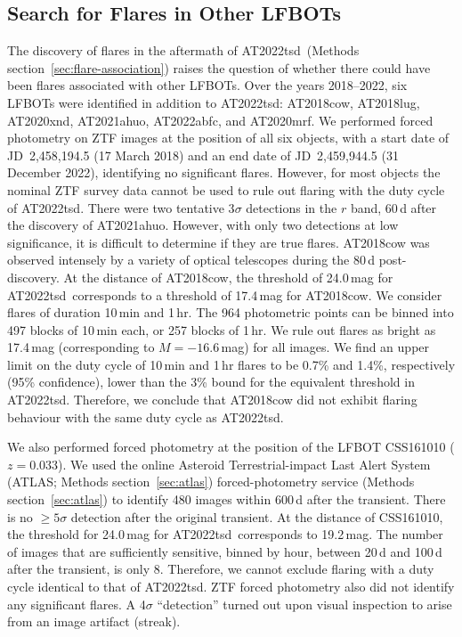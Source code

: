 \documentclass{nature_plusfigure}
\newcommand{\at}{AT2022tsd}
\begin{document}
\begin{methods}
\section{Search for Flares in Other LFBOTs}
\label{sec:flare-search}

The discovery of flares in the aftermath of \at\ (Methods section~\ref{sec:flare-association}) raises the question of whether there could have been flares associated with other LFBOTs. 
Over the years 2018--2022, six LFBOTs were identified in addition to \at: AT2018cow\cite{Prentice2018}, AT2018lug\cite{Ho2020_Koala}, AT2020xnd\cite{Perley2021}, AT2021ahuo, AT2022abfc\cite{Ho2022_AT2022abfc},  
and AT2020mrf\cite{Yao2022}. 
We performed forced photometry on ZTF images at the position of all six objects, with a start date of JD~2,458,194.5 (17 March 2018) and an end date of JD~2,459,944.5 (31 December 2022), identifying no significant flares.
However, for most objects %
the nominal ZTF survey data cannot be used to rule out flaring with the duty cycle of \at.
There were two tentative 3$\sigma$ detections in the $r$ band, 60\,d after the discovery of AT2021ahuo. However, with only two detections at low significance, it is difficult to determine if they are true flares.
AT2018cow was observed intensely by a variety of optical telescopes during the 80\,d post-discovery\cite{Perley2019}. At the distance of AT2018cow, the threshold of 24.0\,mag for \at\ corresponds to a threshold of 17.4\,mag for AT2018cow. We consider flares of duration 10\,min and 1\,hr. The 964 photometric points can be binned into 497 blocks of 10\,min each, or 257 blocks of 1\,hr. We rule out flares as bright as 17.4\,mag (corresponding to $M=-16.6\,$mag) for all images. We find an upper limit on the duty cycle of 10\,min and 1\,hr flares to be 0.7\% and 1.4\%, respectively (95\% confidence), lower than the 3\% bound for the equivalent threshold in \at. Therefore, we conclude that AT2018cow did not exhibit flaring behaviour with the same duty cycle as \at.

We also performed forced photometry at the position of the LFBOT CSS161010\cite{Coppejans2020} ($z=0.033$). 
We used the online Asteroid Terrestrial-impact Last Alert System (ATLAS; Methods section~\ref{sec:atlas})
forced-photometry service (Methods section~\ref{sec:atlas}) to identify 480 images within 600\,d after the transient. There is no $\geq5\sigma$ detection after the original transient. At the distance of CSS161010, the threshold for 24.0\,mag for \at\ corresponds to 19.2\,mag. The number of images that are sufficiently sensitive, binned by hour, between 20\,d and 100\,d after the transient, is only 8. Therefore, we cannot exclude flaring with a duty cycle identical to that of \at.
ZTF forced photometry also did not identify any significant flares. A 4$\sigma$ ``detection'' turned out upon visual inspection to arise from an image artifact (streak). 


\end{methods}
\end{document}
